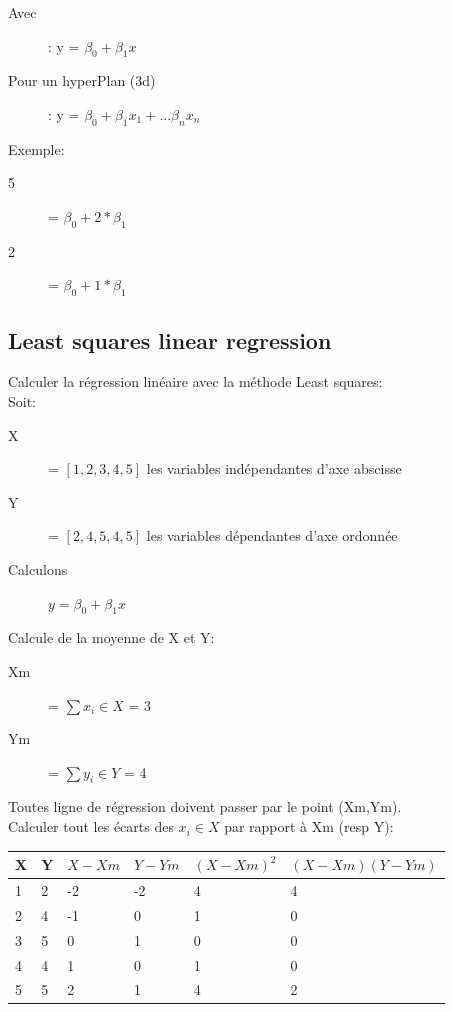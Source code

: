 \begin{description}
\item[Avec]: y  = $\beta_0 + \beta_1 x$
\item[Pour un hyperPlan (3d)]: y = $\beta_0 + \beta_1 x_1 + ... \beta_n x_n$
\end{description}

Exemple:
\begin{description}
\item[5] =  $\beta_0 + 2 * \beta_1$
\item[2] =  $\beta_0 + 1 * \beta_1$
\end{description}

\pagebreak
\subsection{Least squares linear regression}
Calculer la régression linéaire avec la méthode Least squares:\\
Soit:
\begin{description}
\item[X] = $[1,2,3,4,5]$ les variables indépendantes d'axe abscisse
\item[Y] = $[2,4,5,4,5]$ les variables dépendantes d'axe ordonnée
\item[Calculons] $y = \beta_0 + \beta_1 x$
\end{description}
Calcule de la moyenne de X et Y:
\begin{description}
\item[Xm] = $ \sum x_i \in X$ = 3
\item[Ym] = $ \sum y_i \in Y$ = 4
\end{description}
Toutes ligne de régression doivent passer par le point (Xm,Ym).\\
Calculer tout les écarts des $x_i \in X$ par rapport à Xm (resp Y):\\

\begin{tabular}{ll|l|l|l|l}
  \hline
  X  & Y & $X - Xm$ & $Y - Ym$ & $(X-Xm)^2$ & $(X-Xm)(Y-Ym)$\\
  \hline
  1 & 2 & -2 & -2 & 4 & 4\\
  2 & 4 & -1 & 0  & 1 & 0\\
  3 & 5 & 0  & 1  & 0 & 0\\
  4 & 4 & 1  & 0  & 1 & 0\\
  5 & 5 & 2  & 1  & 4 & 2\\ 
  \hline
\end{tabular}

